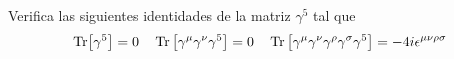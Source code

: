 
\begin{ejercicio} 
	Verifica las siguientes identidades de la matriz $\gamma^5$ tal que
	\begin{equation}
		\Tr [\gamma^5] = 0 \quad \Tr \left[ \gamma^\mu \gamma^\nu \gamma^5 \right] = 0 \quad \Tr \left[ \gamma^\mu \gamma^\nu \gamma^\rho \gamma^\sigma \gamma^5 \right]  = - 4 i \epsilon^{\mu \nu \rho \sigma}
	\end{equation}
\end{ejercicio}


